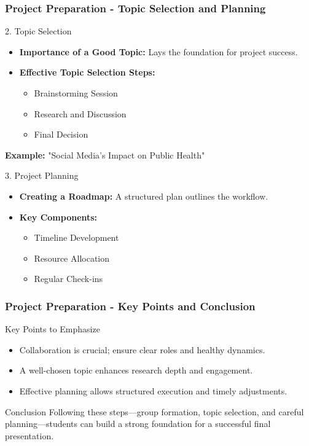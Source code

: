 \documentclass[aspectratio=169]{beamer}
\begin{document}
\begin{frame}[fragile]
    \frametitle{Project Preparation - Topic Selection and Planning}
    \begin{block}{2. Topic Selection}
        \begin{itemize}
            \item \textbf{Importance of a Good Topic:} Lays the foundation for project success.
            \item \textbf{Effective Topic Selection Steps:}
            \begin{itemize}
                \item Brainstorming Session
                \item Research and Discussion
                \item Final Decision
            \end{itemize}
        \end{itemize}
        \textbf{Example:} "Social Media's Impact on Public Health"
    \end{block}
    
    \begin{block}{3. Project Planning}
        \begin{itemize}
            \item \textbf{Creating a Roadmap:} A structured plan outlines the workflow.
            \item \textbf{Key Components:}
            \begin{itemize}
                \item Timeline Development
                \item Resource Allocation
                \item Regular Check-ins
            \end{itemize}
        \end{itemize}
    \end{block}
\end{frame}

\begin{frame}[fragile]
    \frametitle{Project Preparation - Key Points and Conclusion}
    \begin{block}{Key Points to Emphasize}
        \begin{itemize}
            \item Collaboration is crucial; ensure clear roles and healthy dynamics.
            \item A well-chosen topic enhances research depth and engagement.
            \item Effective planning allows structured execution and timely adjustments.
        \end{itemize}
    \end{block}
    
    \begin{block}{Conclusion}
        Following these steps—group formation, topic selection, and careful planning—students can build a strong foundation for a successful final presentation.
    \end{block}
\end{frame}
\end{document}
